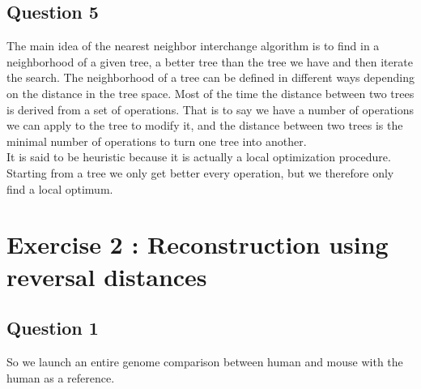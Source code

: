 \documentclass[]{article}
\theoremstyle{definition}
\begin{document}
\subsection{Question 5}
The main idea of the nearest neighbor interchange algorithm is to find in a neighborhood of a given tree, a better tree than the tree we have and then iterate the search. The neighborhood of a tree can be defined in different ways depending on the distance in the tree space. Most of the time the distance between two trees is derived from a set of operations. That is to say we have a number of operations we can apply to the tree to modify it, and the distance between two trees is the minimal number of operations to turn one tree into another.\\
It is said to be heuristic because it is actually a local optimization procedure. Starting from a tree we only get better every operation, but we therefore only find a local optimum.


\newpage 
\section{Exercise 2 : Reconstruction using reversal distances}
\subsection{Question 1}
So we launch an entire genome comparison between human and mouse with the human as a reference.
\end{document}
